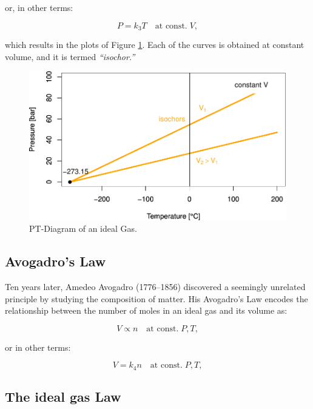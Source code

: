 \documentclass[
  9pt,
]{extbook}
\theoremstyle{definition}
\theoremstyle{definition}
\theoremstyle{definition}
\theoremstyle{definition}
\theoremstyle{remark}
\begin{document}
or, in other terms:

\begin{equation}
P=k_3 T\quad\text{at const.}\;V,
\label{eq:gaylussac2}
\end{equation}

which results in the plots of Figure \ref{fig:FigTPideal}. Each of the curves is obtained at constant volume, and it is termed \emph{``isochor.''}

\begin{figure}

{\centering \includegraphics[width=0.7\linewidth]{pchem1_files/figure-latex/FigTPideal-1} 

}

\caption{PT-Diagram of an ideal Gas.}\label{fig:FigTPideal}
\end{figure}

\subsection{Avogadro's Law}\label{avogadros-law}

Ten years later, Amedeo Avogadro (1776--1856) discovered a seemingly unrelated principle by studying the composition of matter. His Avogadro's Law encodes the relationship between the number of moles in an ideal gas and its volume as:

\begin{equation}
V\propto n\quad\text{at const.}\;P,T,
\label{eq:avogadrolaw1}
\end{equation}

or in other terms:

\begin{equation}
V=k_4 n\quad\text{at const.}\;P,T,
\label{eq:avogadrolaw2}
\end{equation}

\subsection{The ideal gas Law}\label{the-ideal-gas-law}
\end{document}
